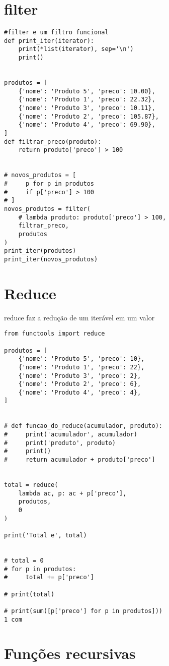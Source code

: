 \documentclass{article}
\begin{document}
\section{filter}
\begin{lstlisting}
#filter e um filtro funcional
def print_iter(iterator):
    print(*list(iterator), sep='\n')
    print()


produtos = [
    {'nome': 'Produto 5', 'preco': 10.00},
    {'nome': 'Produto 1', 'preco': 22.32},
    {'nome': 'Produto 3', 'preco': 10.11},
    {'nome': 'Produto 2', 'preco': 105.87},
    {'nome': 'Produto 4', 'preco': 69.90},
]
def filtrar_preco(produto):
    return produto['preco'] > 100


# novos_produtos = [
#     p for p in produtos
#     if p['preco'] > 100
# ]
novos_produtos = filter(
    # lambda produto: produto['preco'] > 100,
    filtrar_preco,
    produtos
)
print_iter(produtos)
print_iter(novos_produtos)
\end{lstlisting}
\section{Reduce}
reduce faz a redução de um iterável em um valor
\begin{lstlisting}    
from functools import reduce

produtos = [
    {'nome': 'Produto 5', 'preco': 10},
    {'nome': 'Produto 1', 'preco': 22},
    {'nome': 'Produto 3', 'preco': 2},
    {'nome': 'Produto 2', 'preco': 6},
    {'nome': 'Produto 4', 'preco': 4},
]


# def funcao_do_reduce(acumulador, produto):
#     print('acumulador', acumulador)
#     print('produto', produto)
#     print()
#     return acumulador + produto['preco']


total = reduce(
    lambda ac, p: ac + p['preco'],
    produtos,
    0
)

print('Total e', total)


# total = 0
# for p in produtos:
#     total += p['preco']

# print(total)

# print(sum([p['preco'] for p in produtos]))
1 com
\end{lstlisting}
\section{Funções recursivas}
\end{document}
